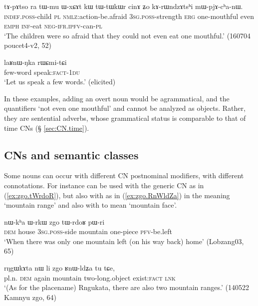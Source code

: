 \begin{exe}
\ex \label{ex:tWtWkWr.cinA}
 \gll tɤ-pɤtso ra tɯ-mu ɯ-xɕɤt kɯ tɯ-tɯkɯr cinɤ ʑo kɤ-rɯndzɤtsʰi mɯ-pjɤ-cʰa-nɯ. \\
 \textsc{indef}.\textsc{poss}-child \textsc{pl} \textsc{nmlz}:action-be.afraid \textsc{3sg}.\textsc{poss}-strength \textsc{erg} one-mouthful even \textsc{emph} \textsc{inf}-eat \textsc{neg}-\textsc{ifr}.\textsc{ipfv}-can-\textsc{pl} \\
\glt `The children were so afraid that they could not even eat one mouthful.' (160704 poucet4-v2, 52)
\end{exe}

\begin{exe}
\ex \label{ex:laRnWNka.rWCmitCi}
 \gll laʁnɯ-ŋka rɯɕmi-tɕi \\
 few-word speak:\textsc{fact}-\textsc{1du} \\
 \glt `Let us speak a few words.' (elicited)
\end{exe}

In these examples, adding an overt noun would be agrammatical, and the quantifiers  `not even one mouthful' and  cannot be analyzed as objects. Rather, they are sentential adverbs, whose grammatical status is comparable to that of time CNs (§ \ref{sec:CN.time}).

\subsection{CNs and semantic classes} \label{sec:CN.classification}


Some nouns can occur with different CN postnominal modifiers, with different connotations. For instance  can be used with the generic CN  as in (\ref{ex:zgo.tWrdoR}), but also with    as in (\ref{ex:zgo.RnWldZa}) in the meaning `mountain range' and also with  to mean `mountain face'.

\begin{exe}
\ex \label{ex:zgo.tWrdoR}
 \gll nɯ-kʰa ɯ-rkɯ zgo tɯ-rdoʁ pɯ-ri \\
\textsc{dem} house \textsc{3sg}.\textsc{poss}-side mountain one-piece \textsc{pfv}-be.left  \\
\glt `When there was only one mountain left (on his way back) home' (Lobzang03, 65)
\end{exe}

\begin{exe}
\ex \label{ex:zgo.RnWldZa}
 \gll rŋgɯkɤta nɯ li zgo ʁnɯ-ldʑa tu tɕe, \\
pl.n. \textsc{dem} again mountain two-long.object exist:\textsc{fact} \textsc{lnk} \\
\glt `(As for the placename) Rngukata, there are also two mountain ranges.' (140522 Kamnyu zgo, 64)
\end{exe}




